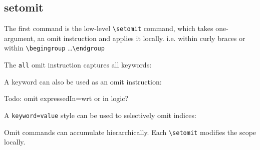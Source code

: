 \documentclass[10pt,a4paper]{article}
\begin{document}

\subsection{setomit}
The first command is the low-level \verb=\setomit= command, which takes one-argument, an omit instruction and applies it locally. i.e. within curly braces or within \verb=\begingroup= \ldots \verb=\endgroup= 

The \verb=all= omit instruction captures all keywords:
\begin{SideBySideExample}[xrightmargin=1cm,frame=single]
  \AngularImpulse[object=1,wrt=0]
\end{SideBySideExample}


A keyword can also be used as an omit instruction:
\begin{SideBySideExample}[xrightmargin=1cm,frame=single]
  \AngularImpulse[object=1,wrt=0]
  \begingroup
    \AngularImpulse[object=1,wrt=0]
    \AngularImpulse[object=1,wrt=0]
  \endgroup
  \AngularImpulse[object=1,wrt=0]
\end{SideBySideExample}


Todo: omit expressedIn=wrt or in logic?

A \verb+keyword=value+ style can be used to selectively omit indices:
\begin{SideBySideExample}[xrightmargin=1cm,frame=single]
  {
    \AngularImpulse[object=1,wrt=0]
    \AngularImpulse[object=2,wrt=1]
  }
\end{SideBySideExample}

Omit commands can accumulate hierarchically. Each \verb=\setomit= modifies the scope locally.
\begin{SideBySideExample}[xrightmargin=1cm,frame=single]
\end{SideBySideExample}
\end{document}
